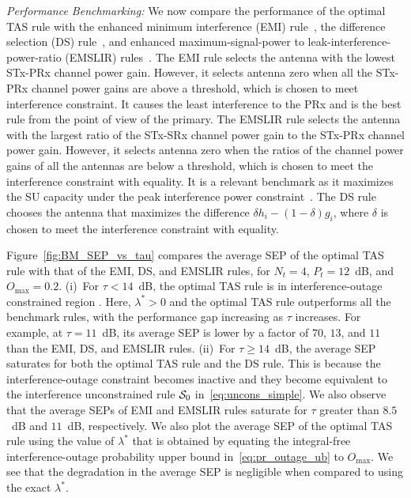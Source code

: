 \documentclass[12pt,draftcls,peerreview,onecolumn]{IEEEtran}
\newcommand{\lam}{\lambda}
\newcommand{\lamstar}{\lam^{*}}
\newcommand{\Nt}{{N_t}}
\newcommand{\Pt}{{P_t}}
\newcommand{\such}{h}
\newcommand{\puch}{g}
\newcommand{\hk}[1]{{\such_{#1}}}
\newcommand{\gk}[1]{{\puch_{#1}}}
\newcommand{\outmax}{O_{\text{max}}}
\newcommand{\itau}{\tau}
\newcommand{\caluncons}{{\cal S_{\text{0}}}}
\begin{document}
{\em Performance Benchmarking:} We now compare the performance of the optimal TAS rule with the enhanced minimum interference (EMI) rule~\cite{Sarvendranath_2013_TCOM}, the difference selection (DS) rule~\cite{Wang_2011_TCom},  and enhanced maximum-signal-power to leak-interference-power-ratio (EMSLIR) rules~\cite{Sarvendranath_2013_TCOM}.  The EMI rule selects the antenna with the lowest STx-PRx channel power gain. However, it selects antenna zero when all the STx-PRx channel power gains are above a threshold, which is chosen to meet interference constraint. It causes the least interference to the PRx and is the best rule from the point of view of the primary. The EMSLIR rule selects the antenna with the largest ratio of the STx-SRx channel power gain to the STx-PRx channel power gain. However, it selects antenna zero when the ratios of the channel power gains of all the antennas are below a threshold, which is chosen to meet the interference constraint with equality. It is a relevant benchmark as it maximizes the SU capacity under the peak interference power constraint~\cite{Wang_2010_TWC}. The DS rule chooses the antenna that maximizes the difference $\delta \hk{i} -(1-\delta) \gk{i} $, where $\delta$ is chosen to meet the interference constraint with equality.   

Figure~\ref{fig:BM_SEP_vs_tau} compares the average SEP of the optimal TAS rule with that of the EMI, DS, and EMSLIR rules, for $\Nt = 4$, $\Pt = 12$~dB, and $\outmax = 0.2$. (i)~For $\itau < 14$~dB, the optimal TAS rule is in interference-outage constrained region . Here, $\lamstar>0$ and the optimal TAS rule outperforms all the benchmark rules, with the performance gap increasing as $\itau$ increases. For example, at $\itau=11$~dB,  its average SEP is lower by a factor of $70$, $13$, and $11$ than the EMI, DS, and EMSLIR rules. (ii)~For $\itau \geq 14$~dB, the average SEP saturates for both the optimal TAS rule and the DS rule. This is because the interference-outage constraint becomes inactive and they become equivalent to the interference unconstrained rule $\caluncons$ in~\eqref{eq:uncons_simple}. We also observe that the average SEPs of EMI and EMSLIR rules saturate for $\itau$ greater than $8.5$~dB and $11$~dB, respectively. We also plot the average SEP of the optimal TAS rule using the value of $\lamstar$ that is obtained by equating the integral-free interference-outage probability upper bound in~\eqref{eq:pr_outage_ub} to $\outmax$. We see that the degradation in the average SEP  is negligible when compared to using the exact $\lamstar$. 
\end{document}
